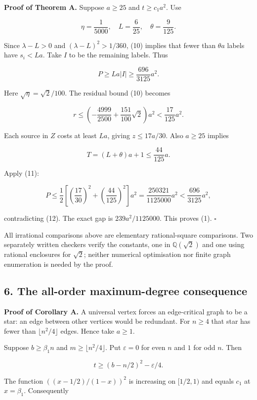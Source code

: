 \documentclass[
  11pt,
  a4paper,
]{article}
\begin{document}
\textbf{Proof of Theorem A.} Suppose \(a\ge25\) and \(t\ge c_1a^2\). Use

\[\eta=\frac1{5000},\quad L=\frac6{25},\quad \theta=\frac9{125}.\]

Since \(\lambda-L>0\) and \((\lambda-L)^2>1/360\), (10) implies that
fewer than \(\theta a\) labels have \(s_i<La\). Take \(I\) to be the
remaining labels. Thus

\[P\ge La|I|\ge\frac{696}{3125}a^2. \tag{12}\]

Here \(\sqrt\eta=\sqrt2/100\). The residual bound (10) becomes

\[r\le\left(-\frac{4999}{2500}+\frac{151}{100}\sqrt2\right)a^2<\frac{17}{125}a^2.\]

Each source in \(Z\) costs at least \(La\), giving \(z\le17a/30\). Also
\(a\ge25\) implies

\[T=(L+\theta)a+1\le\frac{44}{125}a.\]

Apply (11):

\[P\le\frac12\left[\left(\frac{17}{30}\right)^2+\left(\frac{44}{125}\right)^2\right]a^2=\frac{250321}{1125000}a^2<\frac{696}{3125}a^2,\]

contradicting (12). The exact gap is \(239a^2/1125000\). This proves
(1). \(\square\)

All irrational comparisons above are elementary rational-square
comparisons. Two separately written checkers verify the constants, one
in \(\mathbb Q(\sqrt2)\) and one using rational enclosures for
\(\sqrt2\); neither numerical optimisation nor finite graph enumeration
is needed by the proof.

\subsection{6. The all-order maximum-degree
consequence}\label{the-all-order-maximum-degree-consequence}

\textbf{Proof of Corollary A.} A universal vertex forces an
edge-critical graph to be a star: an edge between other vertices would
be redundant. For \(n\ge4\) that star has fewer than
\(\lfloor n^2/4\rfloor\) edges. Hence take \(a\ge1\).

Suppose \(b\ge\beta_1n\) and \(m\ge\lfloor n^2/4\rfloor\). Put
\(\varepsilon=0\) for even \(n\) and \(1\) for odd \(n\). Then

\[t\ge(b-n/2)^2-\varepsilon/4.\]

The function \(((x-1/2)/(1-x))^2\) is increasing on \([1/2,1)\) and
equals \(c_1\) at \(x=\beta_1\). Consequently
\end{document}
